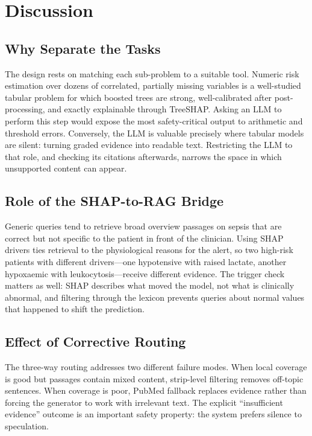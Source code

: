 \documentclass[conference]{IEEEtran}
\begin{document}
\section{Discussion}

\subsection{Why Separate the Tasks}
The design rests on matching each sub-problem to a suitable tool. Numeric
risk estimation over dozens of correlated, partially missing variables is a
well-studied tabular problem for which boosted trees are strong,
well-calibrated after post-processing, and exactly explainable through
TreeSHAP. Asking an LLM to perform this step would expose the most
safety-critical output to arithmetic and threshold errors. Conversely, the
LLM is valuable precisely where tabular models are silent: turning graded
evidence into readable text. Restricting the LLM to that role, and checking
its citations afterwards, narrows the space in which unsupported content
can appear.

\subsection{Role of the SHAP-to-RAG Bridge}
Generic queries tend to retrieve broad overview passages on sepsis that are
correct but not specific to the patient in front of the clinician. Using
SHAP drivers ties retrieval to the physiological reasons for the alert, so
two high-risk patients with different drivers---one hypotensive with raised
lactate, another hypoxaemic with leukocytosis---receive different evidence.
The trigger check matters as well: SHAP describes what moved the model, not
what is clinically abnormal, and filtering through the lexicon prevents
queries about normal values that happened to shift the prediction.

\subsection{Effect of Corrective Routing}
The three-way routing addresses two different failure modes. When local
coverage is good but passages contain mixed content, strip-level filtering
removes off-topic sentences. When coverage is poor, PubMed fallback
replaces evidence rather than forcing the generator to work with irrelevant
text. The explicit ``insufficient evidence'' outcome is an important safety
property: the system prefers silence to speculation.
\end{document}
